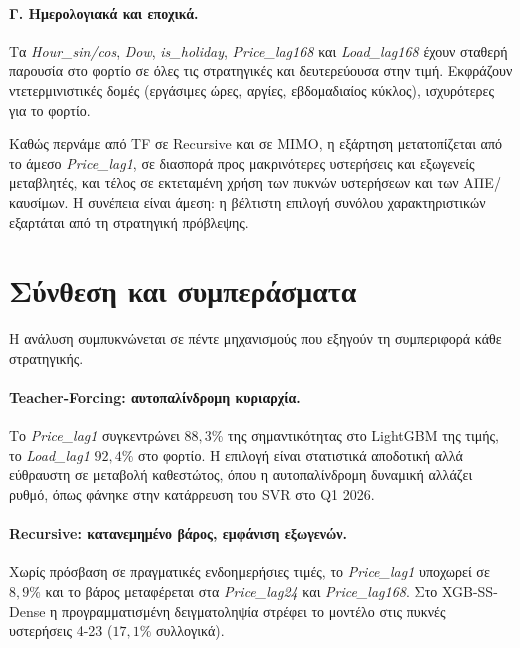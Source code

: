 \paragraph*{Γ. Ημερολογιακά και εποχικά.}
Τα \textit{Hour\_sin/cos}, \textit{Dow}, \textit{is\_holiday},
\textit{Price\_lag168} και \textit{Load\_lag168} έχουν σταθερή παρουσία στο φορτίο
σε όλες τις στρατηγικές και δευτερεύουσα στην τιμή. Εκφράζουν ντετερμινιστικές
δομές (εργάσιμες ώρες, αργίες, εβδομαδιαίος κύκλος), ισχυρότερες για το φορτίο.

Καθώς περνάμε από TF σε Recursive και σε MIMO, η εξάρτηση μετατοπίζεται από το
άμεσο \textit{Price\_lag1}, σε διασπορά προς μακρινότερες υστερήσεις και εξωγενείς
μεταβλητές, και τέλος σε εκτεταμένη χρήση των πυκνών υστερήσεων και των
ΑΠΕ/καυσίμων. Η συνέπεια είναι άμεση: η βέλτιστη επιλογή συνόλου χαρακτηριστικών
εξαρτάται από τη στρατηγική πρόβλεψης.

\section{Σύνθεση και συμπεράσματα}
\label{sec:fi_conclusions}

Η ανάλυση συμπυκνώνεται σε πέντε μηχανισμούς που εξηγούν τη συμπεριφορά κάθε
στρατηγικής.

\paragraph*{Teacher-Forcing: αυτοπαλίνδρομη κυριαρχία.}
Το \textit{Price\_lag1} συγκεντρώνει $88{,}3\%$ της σημαντικότητας στο LightGBM
της τιμής, το \textit{Load\_lag1} $92{,}4\%$ στο φορτίο. Η επιλογή είναι
στατιστικά αποδοτική αλλά εύθραυστη σε μεταβολή καθεστώτος, όπου η αυτοπαλίνδρομη
δυναμική αλλάζει ρυθμό, όπως φάνηκε στην κατάρρευση του SVR στο Q1 2026.

\paragraph*{Recursive: κατανεμημένο βάρος, εμφάνιση εξωγενών.}
Χωρίς πρόσβαση σε πραγματικές ενδοημερήσιες τιμές, το \textit{Price\_lag1}
υποχωρεί σε $8{,}9\%$ και το βάρος μεταφέρεται στα \textit{Price\_lag24} και
\textit{Price\_lag168}. Στο XGB-SS-Dense η προγραμματισμένη δειγματοληψία στρέφει
το μοντέλο στις πυκνές υστερήσεις 4-23 ($17{,}1\%$ συλλογικά).

